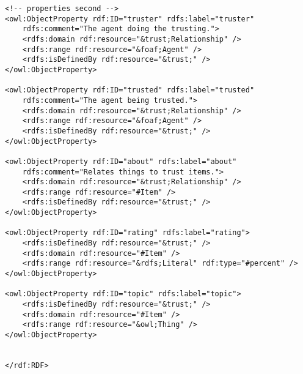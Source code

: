 \documentclass[onecolumn]{acm_proc_article-sp}
\begin{document}
\begin{verbatim}
<!-- properties second -->
<owl:ObjectProperty rdf:ID="truster" rdfs:label="truster"
    rdfs:comment="The agent doing the trusting.">
    <rdfs:domain rdf:resource="&trust;Relationship" />
    <rdfs:range rdf:resource="&foaf;Agent" />
    <rdfs:isDefinedBy rdf:resource="&trust;" />
</owl:ObjectProperty>

<owl:ObjectProperty rdf:ID="trusted" rdfs:label="trusted"
    rdfs:comment="The agent being trusted.">
    <rdfs:domain rdf:resource="&trust;Relationship" />
    <rdfs:range rdf:resource="&foaf;Agent" />
    <rdfs:isDefinedBy rdf:resource="&trust;" />
</owl:ObjectProperty>

<owl:ObjectProperty rdf:ID="about" rdfs:label="about" 
    rdfs:comment="Relates things to trust items.">
    <rdfs:domain rdf:resource="&trust;Relationship" />
    <rdfs:range rdf:resource="#Item" />
    <rdfs:isDefinedBy rdf:resource="&trust;" />
</owl:ObjectProperty>

<owl:ObjectProperty rdf:ID="rating" rdfs:label="rating">
    <rdfs:isDefinedBy rdf:resource="&trust;" />
    <rdfs:domain rdf:resource="#Item" />
    <rdfs:range rdf:resource="&rdfs;Literal" rdf:type="#percent" />
</owl:ObjectProperty>

<owl:ObjectProperty rdf:ID="topic" rdfs:label="topic">
    <rdfs:isDefinedBy rdf:resource="&trust;" />
    <rdfs:domain rdf:resource="#Item" />
    <rdfs:range rdf:resource="&owl;Thing" />
</owl:ObjectProperty>


</rdf:RDF>
\end{verbatim}

\twocolumn

\balancecolumns
\end{document}
